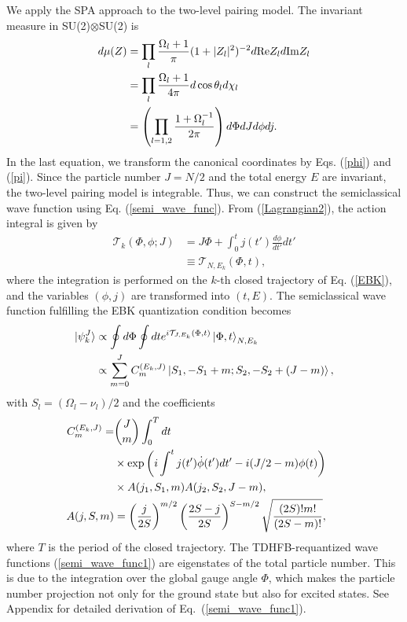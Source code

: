 \documentclass[11pt]{book} %
\begin{document}
We apply the SPA approach to the two-level pairing model.
The invariant measure in SU(2)$\otimes$SU(2) is 
\begin{align}
d\mu(Z) &= \prod_l \frac{\Omega_l+1}{\pi}(1+|Z_l|^2)^{-2}d{\rm Re}Z_ld{\rm Im}Z_l \\
  &= \prod_l \frac{\Omega_l+1}{4\pi}d\cos{\theta_l}d\chi_l \\
	&= \left(\prod_{l=1,2} \frac{1+\Omega_l^{-1}}{2\pi}\right)
             d\Phi dJ d\phi dj .
\end{align}
In the last equation, we transform the canonical coordinates
by Eqs. (\ref{phi}) and (\ref{pi}).
Since the particle number $J=N/2$ and the total energy $E$ are invariant,
the two-level pairing model is integrable.
Thus, we can construct the semiclassical wave function using
Eq. (\ref{semi_wave_func}).
From (\ref{Lagrangian2}), the action integral is given by
\begin{align}
	\mathcal{T}_k(\Phi,\phi;J)
	&= J\Phi + \int^t_0
	j(t') \frac{d\phi}{dt'} dt' \nonumber \\
	&\equiv \mathcal{T}_{N,E_k}(\Phi,t) ,
\end{align}
where the integration is performed on the $k$-th
closed trajectory of Eq. (\ref{EBK}), and
the variables $(\phi,j)$ are transformed into $(t,E)$.
The semiclassical wave function fulfilling the EBK quantization condition
becomes
\begin{align}
	\ket{\psi_k^J} &\propto \oint d\Phi \oint dt
	e^{i\mathcal{T}_{J,E_k}(\Phi, t)}
	\ket{\Phi,t}_{N,E_k} \label{semi_wave_func0} \\
  &\propto \sum_{m=0}^{J}C_m^{(E_k,J)}\ket{S_1,-S_1+m;S_2,-S_2+(J-m)} ,
	\label{semi_wave_func1}
\end{align}
with $S_l=(\Omega_l-\nu_l)/2$ and the coefficients
\begin{align}
  C_m^{(E_k,J)} =& \binom{J}{m}\int_0^T dt \nonumber \\
 &\times \exp{\left( i\int^t j(t') \dot{\phi}(t') dt'-i(J/2-m)\phi(t) \right)} \nonumber \\ 
 &\times A(j_1,S_1,m)A(j_2,S_2,J-m) ,\\
  A(j,S,m) &= \left(\frac{j}{2S}\right)^{m/2}\left(\frac{2S-j}{2S}\right)^{S-m/2}\sqrt{\frac{(2S)!m!}{(2S-m)!}}, \hspace{5mm} \nonumber
\end{align}
where $T$ is the period of the closed trajectory.
The TDHFB-requantized wave functions (\ref{semi_wave_func1}) are
eigenstates of the total particle number.
This is due to the integration over the global gauge angle $\Phi$,
which makes the particle number projection not only for the ground state
but also for excited states.
See Appendix for detailed derivation of Eq.~(\ref{semi_wave_func1}). 
\end{document}
